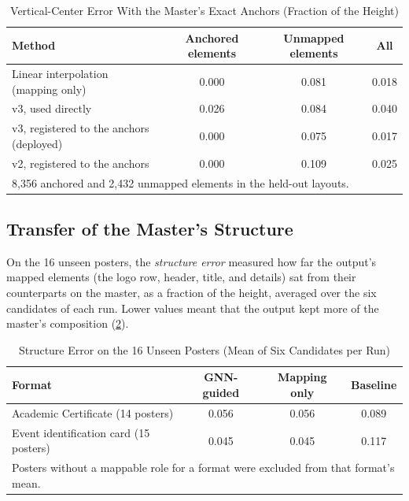 \begin{refsection}
\begin{table}[ht]
\centering
\caption{Vertical-Center Error With the Master's Exact Anchors (Fraction of the Height)}
\label{tab:gnn-anchors}
\small
\begin{tabular}{l c c c}
\hline
\textbf{Method} & \textbf{Anchored elements} & \textbf{Unmapped elements} & \textbf{All} \\ \hline
Linear interpolation (mapping only) & 0.000 & 0.081 & 0.018 \\
v3, used directly & 0.026 & 0.084 & 0.040 \\
v3, registered to the anchors (deployed) & 0.000 & 0.075 & 0.017 \\
v2, registered to the anchors & 0.000 & 0.109 & 0.025 \\ \hline
\multicolumn{4}{p{0.80\textwidth}}{\footnotesize 8,356 anchored and 2,432 unmapped elements in the held-out layouts.}
\end{tabular}
\end{table}

\subsection{Transfer of the Master's Structure}

On the 16 unseen posters, the \textit{structure error} measured how far the output's mapped elements (the logo row, header, title, and details) sat from their counterparts on the master, as a fraction of the height, averaged over the six candidates of each run. Lower values meant that the output kept more of the master's composition (\ref{tab:structure-error}).

\begin{table}[ht]
\centering
\caption{Structure Error on the 16 Unseen Posters (Mean of Six Candidates per Run)}
\label{tab:structure-error}
\small
\begin{tabular}{l c c c}
\hline
\textbf{Format} & \textbf{GNN-guided} & \textbf{Mapping only} & \textbf{Baseline} \\ \hline
Academic Certificate (14 posters) & 0.056 & 0.056 & 0.089 \\
Event identification card (15 posters) & 0.045 & 0.045 & 0.117 \\ \hline
\multicolumn{4}{p{0.80\textwidth}}{\footnotesize Posters without a mappable role for a format were excluded from that format's mean.}
\end{tabular}
\end{table}


\end{refsection}
